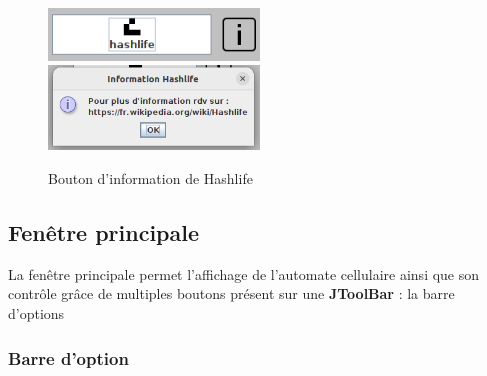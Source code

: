 \begin{figure}[H]
    \centering
    \includegraphics[width=0.5\textwidth]{images/imgInterface/boutonInformation.png}
    \includegraphics[width=0.5\textwidth]{images/imgInterface/popup.png}
    \caption{Bouton d'information de Hashlife}
    \label{fig:bouton info}
\end{figure}

\subsection{Fenêtre principale}
\par La fenêtre principale permet l'affichage de l'automate cellulaire ainsi que son contrôle grâce de multiples boutons présent sur une \textbf{JToolBar} : la barre d'options

\subsubsection{Barre d'option}

